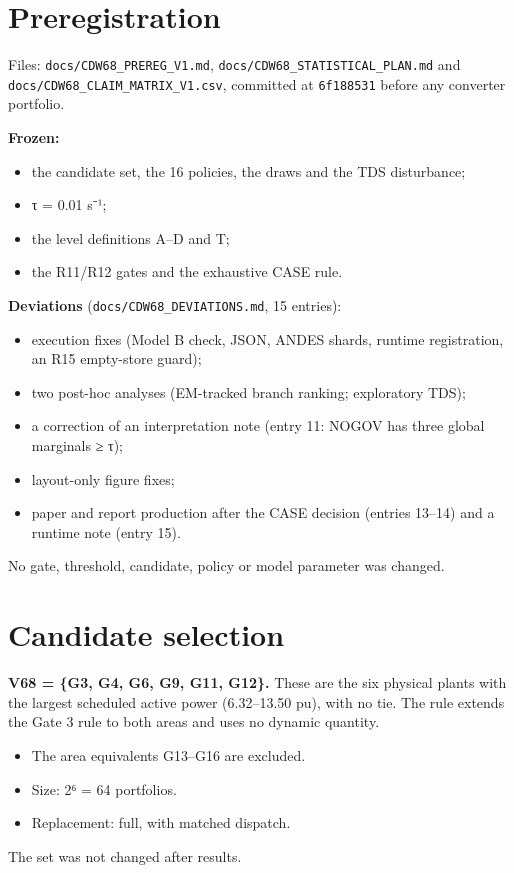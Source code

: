 \documentclass[10pt,a4paper]{article}
\begin{document}
\section{Preregistration}
Files: \texttt{docs/\allowbreak{}CDW68\_\allowbreak{}PREREG\_\allowbreak{}V1.md}, \texttt{docs/\allowbreak{}CDW68\_\allowbreak{}STATISTICAL\_\allowbreak{}PLAN.md} and \texttt{docs/\allowbreak{}CDW68\_\allowbreak{}CLAIM\_\allowbreak{}MATRIX\_\allowbreak{}V1.csv}, committed at \texttt{6f188531} before any converter portfolio.

\textbf{Frozen:}

\begin{itemize}
\item the candidate set, the 16 policies, the draws and the TDS disturbance;
\item τ = 0.01 s⁻¹;
\item the level definitions A–D and T;
\item the R11/R12 gates and the exhaustive CASE rule.
\end{itemize}
\textbf{Deviations} (\texttt{docs/\allowbreak{}CDW68\_\allowbreak{}DEVIATIONS.md}, 15 entries):

\begin{itemize}
\item execution fixes (Model B check, JSON, ANDES shards, runtime registration, an R15 empty-store guard);
\item two post-hoc analyses (EM-tracked branch ranking; exploratory TDS);
\item a correction of an interpretation note (entry 11: NOGOV has three global marginals ≥ τ);
\item layout-only figure fixes;
\item paper and report production after the CASE decision (entries 13–14) and a runtime note (entry 15).
\end{itemize}
No gate, threshold, candidate, policy or model parameter was changed.

\section{Candidate selection}
\textbf{V68 = \{G3, G4, G6, G9, G11, G12\}.} These are the six physical plants with the largest scheduled active power (6.32–13.50 pu), with no tie. The rule extends the Gate 3 rule to both areas and uses no dynamic quantity.

\begin{itemize}
\item The area equivalents G13–G16 are excluded.
\item Size: 2⁶ = 64 portfolios.
\item Replacement: full, with matched dispatch.
\end{itemize}
The set was not changed after results.
\end{document}

